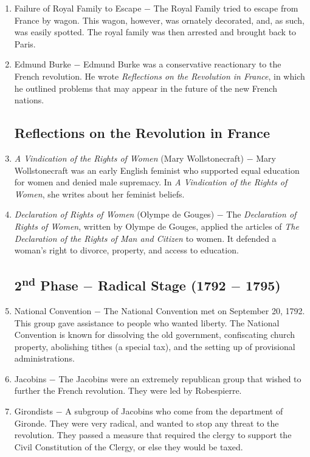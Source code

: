\documentclass[12pt]{article}
\begin{document}
\begin{enumerate}
\item Failure of Royal Family to Escape $-$ The Royal Family tried to escape from France by wagon. This wagon, however, was ornately decorated, and, as such, was easily spotted. The royal family was then arrested and brought back to Paris.

\item Edmund Burke $-$ Edmund Burke was a conservative reactionary to the French revolution. He wrote \textit{Reflections on the Revolution in France}, in which he outlined problems that may appear in the future of the new French nations.

\subsection{Reflections on the Revolution in France}

\item \textit{A Vindication of the Rights of Women} (Mary Wollstonecraft) $-$ Mary Wollstonecraft was an early English feminist who supported equal education for women and denied male supremacy. In \textit{A Vindication of the Rights of Women}, she writes about her feminist beliefs.

\item \textit{Declaration of Rights of Women} (Olympe de Gouges) $-$ The \textit{Declaration of Rights of Women}, written by Olympe de Gouges, applied the articles of \textit{The Declaration of the Rights of Man and Citizen} to women. It defended a woman's right to divorce, property, and access to education. 

\subsection{2\textsuperscript{nd} Phase $-$ Radical Stage (1792 $-$ 1795)}

\item National Convention $-$ The National Convention met on September 20, 1792. This group gave assistance to people who wanted liberty. The National Convention is known for dissolving the old government, confiscating church property, abolishing tithes (a special tax), and the setting up of provisional administrations.

\item Jacobins $-$ The Jacobins were an extremely republican group that wished to further the French revolution. They were led by Robespierre.

\item Girondists $-$ A subgroup of Jacobins who come from the department of Gironde. They were very radical, and wanted to stop any threat to the revolution. They passed a measure that required the clergy to support the Civil Constitution of the Clergy, or else they would be taxed.


\end{enumerate}
\end{document}
